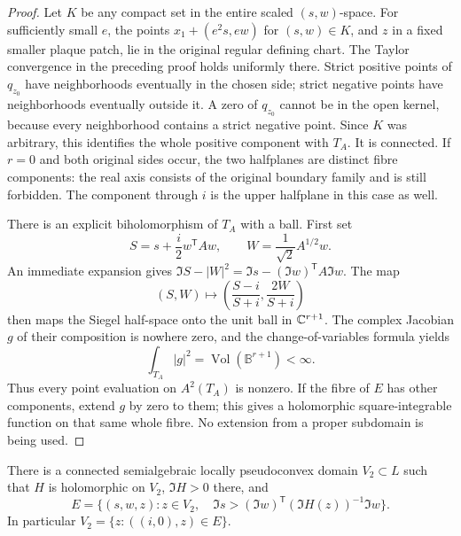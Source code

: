 \begin{proof}
Let $K$ be any compact set in the entire scaled $(s,w)$-space.  For
sufficiently small $e$, the points $x_1+(e^2s,ew)$ for $(s,w)\in K$,
and $z$ in a fixed smaller plaque patch, lie in the original regular
defining chart.  The Taylor convergence in the preceding proof holds
uniformly there.  Strict positive points of $q_{z_0}$ have neighborhoods
eventually in the chosen side; strict negative points have neighborhoods
eventually outside it.  A zero of $q_{z_0}$ cannot be in the open kernel,
because every neighborhood contains a strict negative point.  Since
$K$ was arbitrary, this identifies the whole positive component with
$T_A$.  It is connected.  If $r=0$ and both original sides occur, the
two halfplanes are distinct fibre components: the real axis consists
of the original boundary family and is still forbidden.  The component
through $i$ is the upper halfplane in this case as well.

There is an explicit biholomorphism of $T_A$ with a ball.  First set
\[
          S=s+\frac{i}{2}w^{\mathsf T}Aw,
          \qquad W=\frac1{\sqrt2}A^{1/2}w.
\]
An immediate expansion gives
$\Im S-|W|^2=\Im s-(\Im w)^{\mathsf T}A\Im w$.
The map
\[
          (S,W)\longmapsto
          \left(\frac{S-i}{S+i},\frac{2W}{S+i}\right)
\]
then maps the Siegel half-space onto the unit ball in $\mathbb C^{r+1}$.
The complex Jacobian $g$ of their composition is nowhere zero, and
the change-of-variables formula yields
\[
                     \int_{T_A}|g|^2
                       =\operatorname{Vol}(\mathbb B^{r+1})<\infty.
\]
Thus every point evaluation on $A^2(T_A)$ is nonzero.  If the fibre
of $E$ has other components, extend $g$ by zero to them; this gives
a holomorphic square-integrable function on that same whole fibre.
No extension from a proper subdomain is being used.
\end{proof}

\begin{lemma}\label{win:first-epigraph}
There is a connected semialgebraic locally pseudoconvex domain
$V_2\subset L$ such that $H$ is holomorphic on $V_2$, $\Im H>0$ there,
and
\begin{equation}\label{win:epigraph}
 E=\{(s,w,z):z\in V_2,\quad
              \Im s>(\Im w)^{\mathsf T}(\Im H(z))^{-1}\Im w\}.
\end{equation}
In particular $V_2=\{z:((i,0),z)\in E\}$.
\end{lemma}


